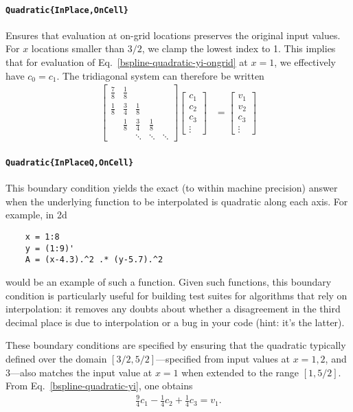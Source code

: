 \documentclass{article}
\begin{document}
\paragraph{\texttt{Quadratic\{InPlace,OnCell\}}}

Ensures that evaluation at on-grid locations preserves the original
input values.  For $x$ locations smaller than $3/2$, we clamp the
lowest index to 1.  This implies that for evaluation of
Eq.~\eqref{bspline-quadratic-yi-ongrid} at $x=1$, we effectively have
$c_0 = c_1$.  The tridiagonal system can therefore be written
\begin{align*}
\begin{bmatrix}
\frac{7}{8} & \frac{1}{8} & & & \\
\frac{1}{8} & \frac{3}{4} & \frac{1}{8} \\
 & \frac{1}{8} & \frac{3}{4} & \frac{1}{8} \\
 & & \ddots & \ddots & \ddots
\end{bmatrix}
\begin{bmatrix}c_1\\ c_2\\ c_3\\\vdots\end{bmatrix}
&=
\begin{bmatrix}v_1 \\ v_2 \\ c_3\\\vdots\end{bmatrix}
\end{align*}


\paragraph{\texttt{Quadratic\{InPlaceQ,OnCell\}}}

This boundary condition yields the exact (to within machine precision)
answer when the underlying function to be interpolated is quadratic
along each axis.  For example, in 2d
\begin{lstlisting}
    x = 1:8
    y = (1:9)'
    A = (x-4.3).^2 .* (y-5.7).^2
\end{lstlisting}
would be an example of such a function.  Given such functions, this
boundary condition is particularly useful for building test suites for
algorithms that rely on interpolation: it removes any doubts about
whether a disagreement in the third decimal place is due to
interpolation or a bug in your code (hint: it's the latter).

These boundary conditions are specified by ensuring that the quadratic
typically defined over the domain $[3/2,5/2]$---specified from input
values at $x=1, 2$, and $3$---also matches the input value at $x=1$
when extended to the range $[1,5/2]$.  From
Eq.~\eqref{bspline-quadratic-yi}, one obtains
\begin{align*}
\frac{9}{4}c_1 - \frac{1}{4}c_2 + \frac{1}{4}c_3 = v_1.
\end{align*}
\end{document}
